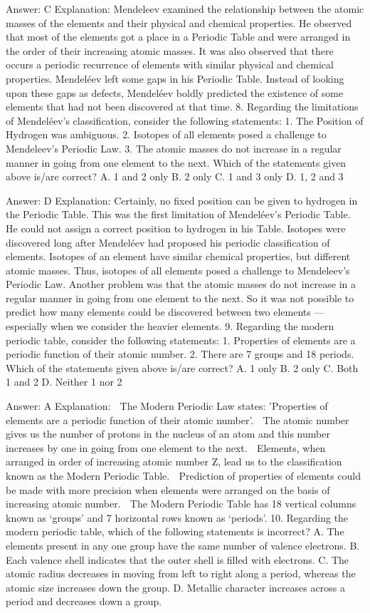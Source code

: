 Answer: C
Explanation: Mendeleev examined the relationship between the atomic masses of the elements and their physical and chemical properties. He observed that most of the elements got a place in a Periodic Table and were arranged in the order of their increasing atomic masses. It was also observed that there occurs a periodic recurrence of elements with similar physical and chemical properties. Mendeléev left some gaps in his Periodic Table. Instead of looking upon these gaps as defects, Mendeléev boldly predicted the existence of some elements that had not been discovered at that time. 8. Regarding the limitations of Mendeléev’s classification, consider the following statements: 1. The Position of Hydrogen was ambiguous. 2. Isotopes of all elements posed a challenge to Mendeleev’s Periodic Law. 3. The atomic masses do not increase in a regular manner in going from one element to the next. Which of the statements given above is/are correct? A. 1 and 2 only B. 2 only C. 1 and 3 only D. 1, 2 and 3 

Answer: D
Explanation: Certainly, no fixed position can be given to hydrogen in the Periodic Table. This was the first limitation of Mendeléev’s Periodic Table. He could not assign a correct position to hydrogen in his Table. Isotopes were discovered long after Mendeléev had proposed his periodic classification of elements. Isotopes of an element have similar chemical properties, but different atomic masses. Thus, isotopes of all elements posed a challenge to Mendeleev’s Periodic Law. Another problem was that the atomic masses do not increase in a regular manner in going from one element to the next. So it was not possible to predict how many elements could be discovered between two elements — especially when we consider the heavier elements. 9. Regarding the modern periodic table, consider the following statements: 1. Properties of elements are a periodic function of their atomic number. 2. There are 7 groups and 18 periods. Which of the statements given above is/are correct? A. 1 only B. 2 only C. Both 1 and 2 D. Neither 1 nor 2 

Answer: A
Explanation:  The Modern Periodic Law states: 'Properties of elements are a periodic function of their atomic number'.  The atomic number gives us the number of protons in the nucleus of an atom and this number increases by one in going from one element to the next.  Elements, when arranged in order of increasing atomic number Z, lead us to the classification known as the Modern Periodic Table.  Prediction of properties of elements could be made with more precision when elements were arranged on the basis of increasing atomic number.  The Modern Periodic Table has 18 vertical columns known as ‘groups’ and 7 horizontal rows known as ‘periods’. 10. Regarding the modern periodic table, which of the following statements is incorrect? A. The elements present in any one group have the same number of valence electrons. B. Each valence shell indicates that the outer shell is filled with electrons. C. The atomic radius decreases in moving from left to right along a period, whereas the atomic size increases down the group. D. Metallic character increases across a period and decreases down a group. 

